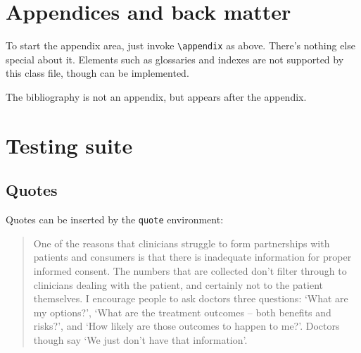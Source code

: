 \documentclass{grattan}
\begin{document}
\appendix

\chapter{Appendices and back matter}\label{chap:appendices}
To start the appendix area, just invoke \verb=\appendix= as above. 
There's nothing else special about it.
Elements such as glossaries and indexes are not supported by this class file, though can be implemented.

The bibliography is not an appendix, but appears after the appendix. 


\printbibliography


\chapter*{Testing suite}
\section{Quotes}
Quotes can be inserted by the \texttt{quote} environment:
\begin{quote}
One of the reasons that clinicians struggle to form partnerships with patients and consumers is that there is inadequate information for proper informed consent.
The numbers that are collected don't filter through to clinicians dealing with the patient, and certainly not to the patient themselves.
I encourage people to ask doctors three questions: `What are my options?', `What are the treatment outcomes -- both benefits and risks?', and `How likely are those outcomes to happen to me?'.
Doctors though say `We just don't have that information'.
\end{quote}
\end{document}
